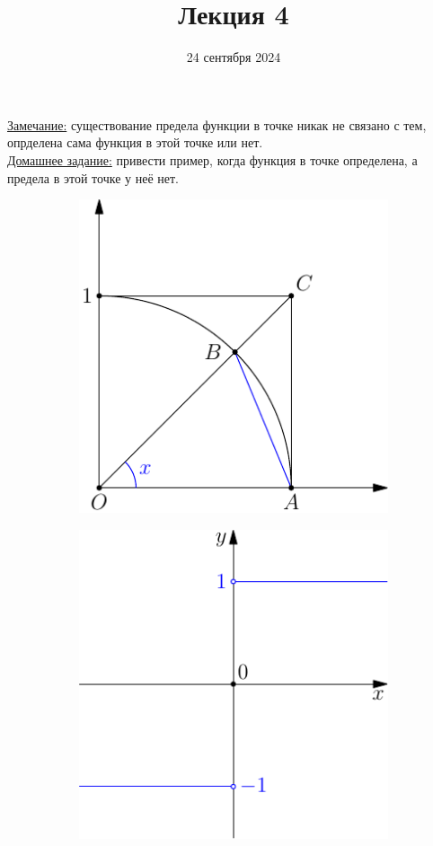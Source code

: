 \documentclass{article}
\title{Лекция 4}
\author{}
\date{24 сентября 2024}
\begin{document}
    \maketitle
    \noindent
    \underline{Замечание:} существование предела функции в точке никак не связано с тем, опрделена сама функция в этой точке или нет.\\
    \underline{Домашнее задание:} привести пример, когда функция в точке определена, а предела в этой точке у неё нет.    
    \begin{figure}[h]
        \begin{subfigure}[t]{0.3\textwidth}
            \includegraphics{pic-1.pdf}
            \caption{}
        \end{subfigure}
        \hfill
        \begin{subfigure}[t]{0.3\textwidth}
            \includegraphics{pic-2.pdf}

\end{subfigure}
\end{figure}
\end{document}
